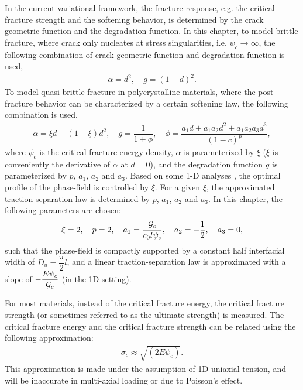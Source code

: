 In the current variational framework, the fracture response, e.g. the critical fracture strength and the softening behavior, is determined by the crack geometric function and the degradation function. In this chapter, to model brittle fracture, where crack only nucleates at stress singularities, i.e. $\psi_c \to \infty$, the following combination of crack geometric function and degradation function is used,
\begin{align}
  \alpha = d^2, \quad g = (1-d)^2.
\end{align}
To model quasi-brittle fracture in polycrystalline materials, where the post-fracture behavior can be characterized by a certain softening law, the following combination is used,
\begin{align}
  \alpha = \xi d- (1-\xi) d^2, \quad g = \dfrac{1}{1+\phi}, \quad \phi = \dfrac{a_1d + a_1a_2d^2 + a_1a_2a_3d^3}{(1-c)^p},
\end{align}
where $\psi_c$ is the critical fracture energy density, $\alpha$ is parameterized by $\xi$ ($\xi$ is conveniently the derivative of $\alpha$ at $d = 0$), and the degradation function $g$ is parameterized by $p$, $a_1$, $a_2$ and $a_3$. Based on some 1-D analyses \cite{wu2017unified}, the optimal profile of the phase-field is controlled by $\xi$. For a given $\xi$, the approximated traction-separation law is determined by $p$, $a_1$, $a_2$ and $a_3$. In this chapter, the following parameters are chosen:
\begin{align}
  \xi = 2, \quad p = 2, \quad a_1 = \dfrac{{\mathcal{G}_c}}{c_0 l \psi_c}, \quad a_2 = -\dfrac{1}{2}, \quad a_3 = 0,
\end{align}
such that the phase-field is compactly supported by a constant half interfacial width of $D_u = \dfrac{\pi}{2}l$, and a linear traction-separation law is approximated with a slope of $-\dfrac{E\psi_c}{{\mathcal{G}_c}}$ (in the 1D setting).

\begin{remark}
  For most materials, instead of the critical fracture energy, the critical fracture strength (or sometimes referred to as the ultimate strength) is measured. The critical fracture energy and the critical fracture strength can be related using the following approximation:
  \begin{align}
    \sigma_c \approx \sqrt{(2E\psi_c)}.
  \end{align}
  This approximation is made under the assumption of 1D uniaxial tension, and will be inaccurate in multi-axial loading or due to Poisson's effect.
\end{remark}

